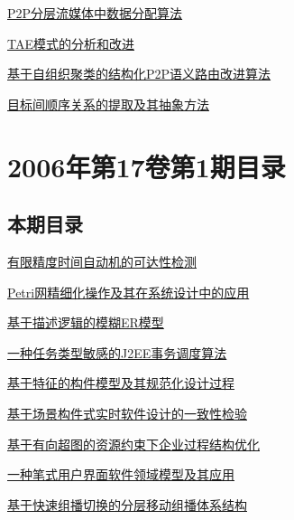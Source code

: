 \documentclass[a4paper]{article}
\begin{document}
\href{http://www.jos.org.cn/ch/reader/download_pdf.aspx?file_no=20060218&year_id=2006&quarter_id=2&falg=1}{P2P分层流媒体中数据分配算法}

\href{http://www.jos.org.cn/ch/reader/download_pdf.aspx?file_no=20060219&year_id=2006&quarter_id=2&falg=1}{TAE模式的分析和改进}

\href{http://www.jos.org.cn/ch/reader/download_pdf.aspx?file_no=20060220&year_id=2006&quarter_id=2&falg=1}{基于自组织聚类的结构化P2P语义路由改进算法}

\href{http://www.jos.org.cn/ch/reader/download_pdf.aspx?file_no=20060301&year_id=2006&quarter_id=2&falg=1}{目标间顺序关系的提取及其抽象方法}


\section{\textbf{2006年第17卷第1期目录}}
\subsection{本期目录}
\href{http://www.jos.org.cn/ch/reader/download_pdf.aspx?file_no=20060101&year_id=2006&quarter_id=1&falg=1}{有限精度时间自动机的可达性检测}

\href{http://www.jos.org.cn/ch/reader/download_pdf.aspx?file_no=20060102&year_id=2006&quarter_id=1&falg=1}{Petri网精细化操作及其在系统设计中的应用}

\href{http://www.jos.org.cn/ch/reader/download_pdf.aspx?file_no=20060103&year_id=2006&quarter_id=1&falg=1}{基于描述逻辑的模糊ER模型}

\href{http://www.jos.org.cn/ch/reader/download_pdf.aspx?file_no=20060104&year_id=2006&quarter_id=1&falg=1}{一种任务类型敏感的J2EE事务调度算法}

\href{http://www.jos.org.cn/ch/reader/download_pdf.aspx?file_no=20060105&year_id=2006&quarter_id=1&falg=1}{基于特征的构件模型及其规范化设计过程}

\href{http://www.jos.org.cn/ch/reader/download_pdf.aspx?file_no=20060106&year_id=2006&quarter_id=1&falg=1}{基于场景构件式实时软件设计的一致性检验}

\href{http://www.jos.org.cn/ch/reader/download_pdf.aspx?file_no=20060107&year_id=2006&quarter_id=1&falg=1}{基于有向超图的资源约束下企业过程结构优化}

\href{http://www.jos.org.cn/ch/reader/download_pdf.aspx?file_no=20060108&year_id=2006&quarter_id=1&falg=1}{一种笔式用户界面软件领域模型及其应用}

\href{http://www.jos.org.cn/ch/reader/download_pdf.aspx?file_no=20060110&year_id=2006&quarter_id=1&falg=1}{基于快速组播切换的分层移动组播体系结构}
\end{document}
